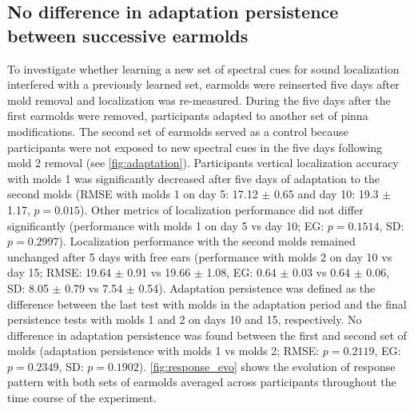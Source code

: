 \subsection{No difference in adaptation persistence between successive earmolds}

To investigate whether learning a new set of spectral cues for sound localization interfered with a previously learned set, earmolds were reinserted five days after mold removal and localization was re-measured. During the five days after the first earmolds were removed, participants adapted to another set of pinna modifications. The second set of earmolds served as a control because participants were not exposed to new spectral cues in the five days following mold 2 removal (see \cref{fig:adaptation}). Participants vertical localization accuracy with molds 1 was significantly decreased after five days of adaptation to the second molds (RMSE with molds 1 on day 5: 17.12 $\pm$ 0.65 and day 10: 19.3 $\pm$ 1.17, $p = 0.015$). Other metrics of localization performance did not differ significantly (performance with molds 1 on day 5 vs day 10; EG: $p = 0.1514$, SD: $p = 0.2997$). Localization performance with the second molds remained unchanged after 5 days with free ears (performance with molds 2 on day 10 vs day 15; RMSE: 19.64 $\pm$ 0.91 vs 19.66 $\pm$ 1.08, EG:  0.64 $\pm$ 0.03 vs 0.64 $\pm$ 0.06, SD:  8.05 $\pm$ 0.79 vs 7.54 $\pm$ 0.54). Adaptation persistence was defined as the difference between the last test with molds in the adaptation period and the final persistence tests with molds 1 and 2 on days 10 and 15, respectively. No difference in adaptation persistence was found between the first and second set of molds (adaptation persistence with molds 1 vs molds 2; RMSE: $p = 0.2119$, EG: $p = 0.2349$, SD: $p = 0.1902$). \cref{fig:response_evo} shows the evolution of response pattern with both sets of earmolds averaged across participants throughout the time course of the experiment.


